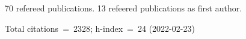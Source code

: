 70 refereed publications. 13 refeered publications as first author.

Total citations~=~2328; h-index~=~24 (2022-02-23)